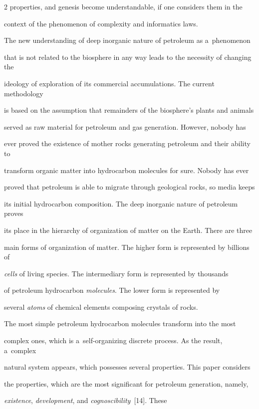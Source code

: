 \begin{multicols}{2}
properties, and genesis become understandable, if one considers them in the 

context of the phenomenon of complexity and informatics laws.

   

The new understanding of deep inorganic nature of petroleum as a~phenomenon 

that is not related to the biosphere in any way leads to the necessity of changing the 

ideology of exploration of its commercial accumulations. The current methodology 

is based on the assumption that remainders of the biosphere's plants and animals 

served as raw material for petroleum and gas generation. However, nobody has 

ever proved the existence of mother rocks generating petroleum and their ability to 

transform organic matter into hydrocarbon molecules for sure. Nobody has ever 

proved that petroleum is able to migrate through geological rocks, so media keeps 

its initial hydrocarbon composition. The deep inorganic nature of petroleum proves 

its place in the hierarchy of organization of matter on the Earth. There are three 

main forms of organization of matter. The higher form is represented by billions of 

\textit{cells} of living species. The intermediary form is represented by thousands 

of petroleum hydrocarbon \textit{molecules}. The lower form is represented by 

several \textit{atoms} of chemical elements composing crystals of rocks. 



The most simple petroleum hydrocarbon molecules transform into the most 

complex ones, which is a~self-organizing discrete process. As the result, a~complex 

natural system appears, which possesses several properties. This paper considers 

the properties, which are the most significant for petroleum generation, namely, 

\textit{existence}, \textit{development}, and \textit{cognoscibility}~[14]. These 


\end{multicols}
